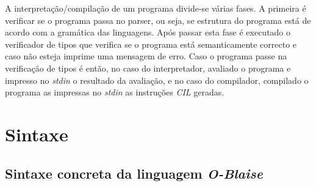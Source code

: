 \vspace{\baselineskip}
A interpretação/compilação de um programa divide-se várias fases. A primeira é 
verificar se o programa passa no parser, ou seja, se estrutura do programa está 
de acordo com a gramática das linguagens. Após passar esta fase é executado o 
verificador de tipos que verifica se o programa está semanticamente correcto e 
caso não esteja imprime uma mensagem de erro. Caso o programa passe na 
verificação de tipos é então, no caso do interpretador, avaliado o programa e 
impresso no \emph{stdin} o resultado da avaliação, e no caso do compilador, 
compilado o programa as impressas no \emph{stdin} as instruções \emph{CIL} 
geradas. 

\newpage
\section{Sintaxe}

\subsection{Sintaxe concreta da linguagem \emph{O-Blaise}}

